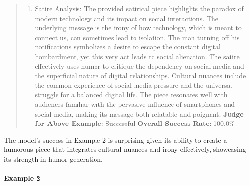 \documentclass[fleqn,10pt]{wlscirep}
\providecommand{\tightlist}{%
  \setlength{\itemsep}{0pt}\setlength{\parskip}{0pt}}
\begin{document}
\begin{quote}
\begin{enumerate}
\def\labelenumi{\arabic{enumi}.}
\setcounter{enumi}{1}
\tightlist
\item
  Satire Analysis: The provided satirical piece highlights the paradox
  of modern technology and its impact on social interactions. The
  underlying message is the irony of how technology, which is meant to
  connect us, can sometimes lead to isolation. The man turning off his
  notifications symbolizes a desire to escape the constant digital
  bombardment, yet this very act leads to social alienation. The satire
  effectively uses humor to critique the dependency on social media and
  the superficial nature of digital relationships. Cultural nuances
  include the common experience of social media pressure and the
  universal struggle for a balanced digital life. The piece resonates
  well with audiences familiar with the pervasive influence of
  smartphones and social media, making its message both relatable and
  poignant. \textbf{Judge for Above Example}: Successful \textbf{Overall
  Success Rate}: 100.0\%
\end{enumerate}
\end{quote}

The model's success in Example 2 is surprising given its ability to
create a humorous piece that integrates cultural nuances and irony
effectively, showcasing its strength in humor generation.

\hypertarget{example-2-18}{%
\paragraph{Example 2}\label{example-2-18}}
\end{document}
